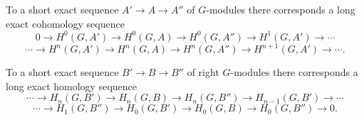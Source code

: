 To a short exact sequence $A' \xrightarrow{} A \xrightarrow{} A''$ of $G$-modules there corresponds a long exact cohomology sequence
$$0 \to H^0(G, A') \to H^0(G, A) \to H^0(G, A'') \to H^1(G, A') \to \cdots$$
$$\cdots \to H^n(G, A') \to H^n(G, A) \to H^n(G, A'') \to H^{n+1}(G, A') \to \cdots.$$

To a short exact sequence $B' \xrightarrow{} B \xrightarrow{} B''$ of right $G$-modules there corresponds a long exact homology sequence
$$\cdots \to H_n(G, B') \to H_n(G, B) \to H_n(G, B'') \to H_{n-1}(G, B') \to \cdots$$
$$\cdots \to H_1(G, B'') \to H_0(G, B') \to H_0(G, B) \to H_0(G, B'') \to 0.$$

